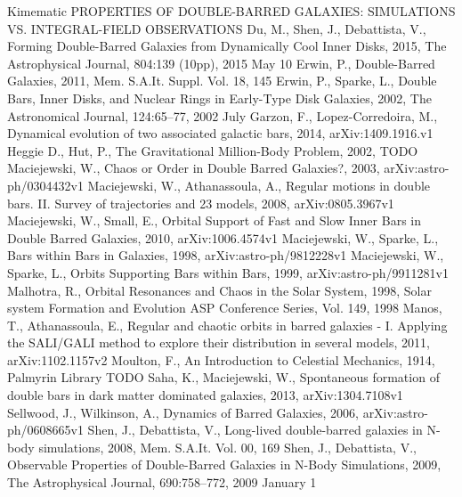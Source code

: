 \documentclass[a4paper,12pt]{article}
\begin{document}
\begin{thebibliography}{1}
Kimematic PROPERTIES OF DOUBLE-BARRED GALAXIES: SIMULATIONS VS. INTEGRAL-FIELD
OBSERVATIONS
Du, M., Shen, J., Debattista, V., Forming Double-Barred Galaxies from Dynamically Cool Inner Disks, 2015, The Astrophysical Journal, 804:139 (10pp), 2015 May 10 
Erwin, P., Double-Barred Galaxies, 2011, Mem. S.A.It. Suppl. Vol. 18, 145
Erwin, P., Sparke, L., Double Bars, Inner Disks, and Nuclear Rings in Early-Type Disk Galaxies, 2002, The Astronomical Journal, 124:65–77, 2002 July
Garzon, F., Lopez-Corredoira, M., Dynamical evolution of two associated galactic bars, 2014, arXiv:1409.1916.v1
Heggie D., Hut, P., The Gravitational Million-Body Problem, 2002, TODO
Maciejewski, W., Chaos or Order in Double Barred Galaxies?, 2003, arXiv:astro-ph/0304432v1
Maciejewski, W., Athanassoula, A., Regular motions in double bars. II. Survey of trajectories and 23 models, 2008, arXiv:0805.3967v1
Maciejewski, W., Small, E., Orbital Support of Fast and Slow Inner Bars in Double Barred Galaxies, 2010, arXiv:1006.4574v1
Maciejewski, W., Sparke, L., Bars within Bars in Galaxies, 1998, arXiv:astro-ph/9812228v1
Maciejewski, W., Sparke, L., Orbits Supporting Bars within Bars, 1999, arXiv:astro-ph/9911281v1
Malhotra, R., Orbital Resonances and Chaos in the Solar System, 1998, Solar system Formation and Evolution ASP Conference Series, Vol. 149, 1998
Manos, T., Athanassoula, E., Regular and chaotic orbits in barred galaxies - I. Applying the SALI/GALI method to explore their distribution in several models, 2011, arXiv:1102.1157v2
Moulton, F., An Introduction to Celestial Mechanics, 1914, Palmyrin Library TODO
Saha, K., Maciejewski, W., Spontaneous formation of double bars in dark matter dominated galaxies, 2013, arXiv:1304.7108v1
Sellwood, J., Wilkinson, A., Dynamics of Barred Galaxies, 2006, arXiv:astro-ph/0608665v1
Shen, J., Debattista, V., Long-lived double-barred galaxies in N-body simulations, 2008, Mem. S.A.It. Vol. 00, 169
Shen, J., Debattista, V., Observable Properties of Double-Barred Galaxies in N-Body Simulations, 2009, The Astrophysical Journal, 690:758–772, 2009 January 1


\end{thebibliography}
\end{document}

